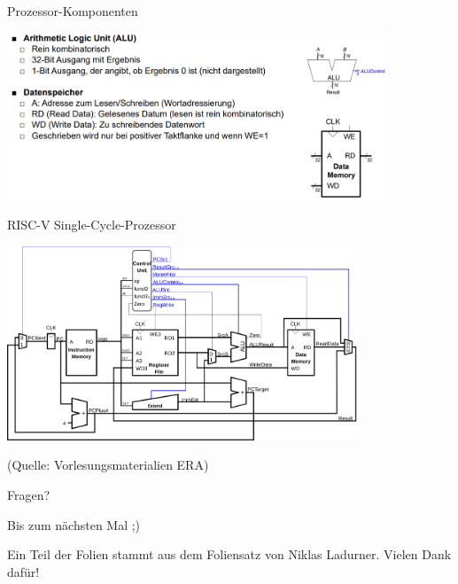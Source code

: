 \documentclass[
  german,            %
  aspectratio=169,    %
]{tumbeamer}
\begin{document}
\begin{frame}[c, fragile]{Prozessor-Komponenten}{}
	\begin{center}
		\includegraphics[width=0.85\textwidth]{w08_prozessorcomponents2.png}
	\end{center}
\end{frame}

\begin{frame}[c]{RISC-V Single-Cycle-Prozessor}{}
	\begin{center}
		\includegraphics[width=0.79\textwidth]{w08_single_cycle.png}
	\end{center}
	\centering
	\tiny (Quelle: Vorlesungsmaterialien ERA)
\end{frame}

\begin{frame}[c]{}{} 
  \begin{center}
    \LARGE Fragen?
  \end{center}
  \vspace{0.5cm}
  \begin{center}
    \LARGE Bis zum nächsten Mal ;) \\
  \end{center}
  \vspace{1.0cm}
  \begin{center}
    \small Ein Teil der Folien stammt aus dem Foliensatz von Niklas Ladurner. Vielen Dank dafür!
  \end{center}
\end{frame}
\end{document}
